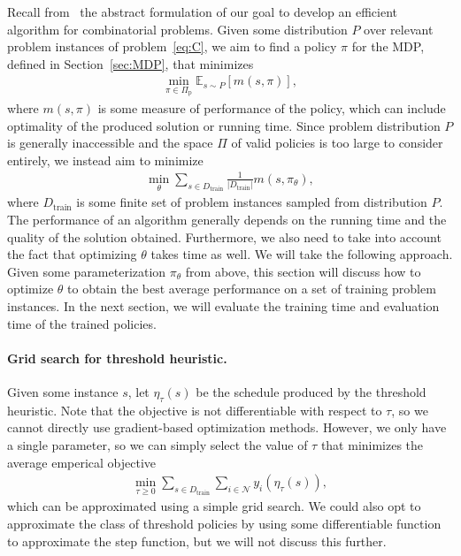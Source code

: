 \documentclass[a4paper]{report}
\theoremstyle{definition}
\theoremstyle{plain}
\begin{document}
Recall from~ the abstract formulation of our goal to develop an efficient
algorithm for combinatorial problems. Given some distribution $P$ over relevant
problem instances of problem~\eqref{eq:C}, we aim to find a policy $\pi$ for the MDP,
defined in Section~\ref{sec:MDP}, that minimizes
\begin{align*}
  \min_{\pi \in \Pi_\mathrm{p}} \mathbb{E}_{s \sim P} [m(s,\pi)] ,
\end{align*}
where $m(s, \pi)$ is some measure of performance of the policy, which can include
optimality of the produced solution or running time.
%
Since problem distribution $P$ is generally inaccessible and the space $\Pi$ of
valid policies is too large to consider entirely, we instead aim to minimize
\begin{align}
  \min_{\theta} \sum_{s \in D_\text{train}} \frac{1}{|D_\text{train}|} m(s, \pi_\theta) ,
\end{align}
where $D_\text{train}$ is some finite set of problem instances sampled from
distribution $P$.
%
The performance of an algorithm generally depends on the running time and the
quality of the solution obtained.
%
Furthermore, we also need to take into account the fact that optimizing $\theta$
takes time as well.
%
We will take the following approach.
%
Given some parameterization $\pi_\theta$ from above, this section will discuss how to optimize $\theta$ to obtain the best average performance on a set of training problem instances.
%
In the next section, we will evaluate the training time and evaluation time of
the trained policies.


\paragraph{Grid search for threshold heuristic.}
Given some instance $s$, let $\eta_{\tau}(s)$ be the schedule produced by the
threshold heuristic. Note that the objective is not differentiable with respect
to $\tau$, so we cannot directly use gradient-based optimization methods. However,
we only have a single parameter, so we can simply select the value of $\tau$ that
minimizes the average emperical objective
%
\begin{align}
  \min_{\tau \geq 0} \sum_{s \in D_\text{train}} \sum_{i \in \mathcal{N}} y_i(\eta_{\tau}(s)) ,
\end{align}
%
which can be approximated using a simple grid search.
%
We could also opt to approximate the class of threshold policies by using some
differentiable function to approximate the step function, but we will not
discuss this further.
\end{document}
